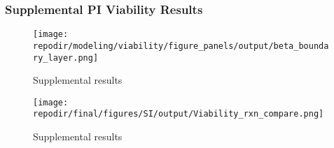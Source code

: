 \clearpage

\subsubsection{Supplemental PI Viability Results}

\begin{figure}
\centering
\texttt{[image: \\repodir/modeling/viability/figure\_panels/output/beta\_boundary\_layer.png]}
\caption{Supplemental results}
\end{figure}

\begin{figure}
\centering
\texttt{[image: \\repodir/final/figures/SI/output/Viability\_rxn\_compare.png]}
\caption{Supplemental results}
\end{figure}
